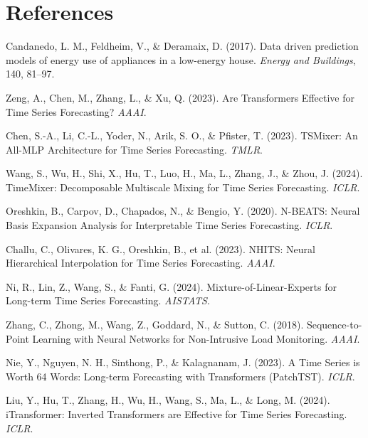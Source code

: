 \documentclass[11pt,letterpaper]{article}
\begin{document}
\section*{References}

\begin{enumerate}[leftmargin=*,itemsep=2pt,label={[\arabic*]}]
  \item Candanedo, L. M., Feldheim, V., \& Deramaix, D. (2017). Data
        driven prediction models of energy use of appliances in a
        low-energy house. \emph{Energy and Buildings}, 140, 81--97.
  \item Zeng, A., Chen, M., Zhang, L., \& Xu, Q. (2023). Are Transformers
        Effective for Time Series Forecasting? \emph{AAAI}.
  \item Chen, S.-A., Li, C.-L., Yoder, N., Arik, S. O., \& Pfister, T.
        (2023). TSMixer: An All-MLP Architecture for Time Series
        Forecasting. \emph{TMLR}.
  \item Wang, S., Wu, H., Shi, X., Hu, T., Luo, H., Ma, L., Zhang, J., \&
        Zhou, J. (2024). TimeMixer: Decomposable Multiscale Mixing for
        Time Series Forecasting. \emph{ICLR}.
  \item Oreshkin, B., Carpov, D., Chapados, N., \& Bengio, Y. (2020).
        N-BEATS: Neural Basis Expansion Analysis for Interpretable Time
        Series Forecasting. \emph{ICLR}.
  \item Challu, C., Olivares, K. G., Oreshkin, B., et al. (2023). NHITS:
        Neural Hierarchical Interpolation for Time Series Forecasting.
        \emph{AAAI}.
  \item Ni, R., Lin, Z., Wang, S., \& Fanti, G. (2024).
        Mixture-of-Linear-Experts for Long-term Time Series Forecasting.
        \emph{AISTATS}.
  \item Zhang, C., Zhong, M., Wang, Z., Goddard, N., \& Sutton, C. (2018).
        Sequence-to-Point Learning with Neural Networks for Non-Intrusive
        Load Monitoring. \emph{AAAI}.
  \item Nie, Y., Nguyen, N. H., Sinthong, P., \& Kalagnanam, J. (2023). A
        Time Series is Worth 64 Words: Long-term Forecasting with
        Transformers (PatchTST). \emph{ICLR}.
  \item Liu, Y., Hu, T., Zhang, H., Wu, H., Wang, S., Ma, L., \& Long, M.
        (2024). iTransformer: Inverted Transformers are Effective for
        Time Series Forecasting. \emph{ICLR}.
\end{enumerate}
\end{document}
